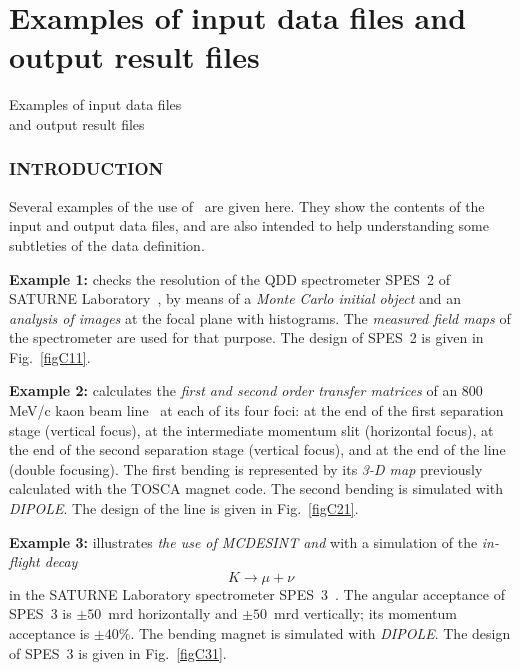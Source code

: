 

\pagestyle{empty}
\part{Examples of input data files and output result files}
{Examples of input data files \\
and output result files}
 \cleardoublepage

\pagestyle{myheadings}

\section*{INTRODUCTION} 

Several examples of the use of \zgou\ are given here. They
show the contents of the input and output data files, and are also 
intended to help understanding some subtleties of the data definition.  
\bigskip

\noindent\textbf{Example 1:} checks the resolution of the QDD spectrometer 
SPES~2 of SATURNE Laboratory~\protect\cite{Spes2}, by means of a \emph{Monte Carlo initial 
object} and an \emph{analysis of images} at the focal plane with 
histograms. The \emph{measured field maps} of the spectrometer are used 
for that purpose. The design of SPES~2 is given in Fig.~\ref{figC11}. %
\bigskip

\noindent\textbf{Example 2:} calculates the \emph{first and second order transfer
matrices} of an 800 MeV/c kaon beam line~\protect\cite{BNL} at each of its four foci: at the 
end of the first separation stage (vertical focus), at the 
intermediate momentum slit (horizontal focus), at the end of the 
second separation stage (vertical focus), and at the end of the 
line (double focusing). The first bending is represented by 
its \textsl{3-D map} previously calculated with the TOSCA magnet 
code. The second bending is simulated with \textsl{DIPOLE}. The design of the line 
is given in Fig.~\ref{figC21}. %
\bigskip

\noindent\textbf{Example 3:} illustrates 
\emph{the use of \textsl{MCDESINT} and
 \REBELOTE{}} with a simulation of the \emph{in-flight decay}
$$ K \longrightarrow  \mu  + \nu $$
\noindent in the SATURNE Laboratory spectrometer SPES~3~\protect\cite{Biblio11}. The angular 
acceptance of SPES~3 is $\pm 50$~mrd horizontally and $\pm 50$~mrd
vertically; its momentum acceptance is $\pm 40$\%. The
bending magnet is simulated with \textsl{DIPOLE}.
 The design of SPES~3 is
given in Fig.~\ref{figC31}.  %

